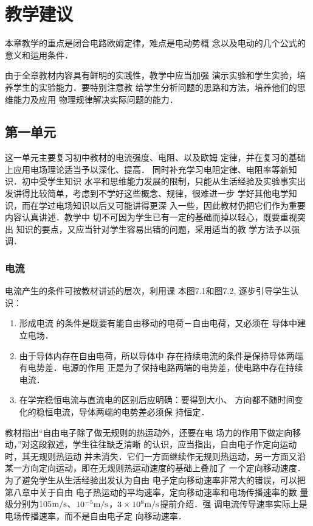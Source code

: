 \section{教学建议}
本章教学的重点是闭合电路欧姆定律，难点是电动势概
念以及电动的几个公式的意义和运用条件．

由于全章教材内容具有鲜明的实践性，教学中应当加强
演示实验和学生实验，培养学生的实验能力．要特别注意教
给学生分析问题的思路和方法，培养他们的思维能力及应用
物理规律解决实际问题的能力．


\subsection{第一单元}
这一单元主要复习初中教材的电流强度、电阻、以及欧姆
定律，并在复习的基础上应用电场理论适当予以深化、提高．
同时补充学习电阻定律、电阻率等新知识．初中受学生知识
水平和思维能力发展的限制，只能从生活经验及实验事实出
发讲得比较简单，考虑到不学好这些概念、规律，很难进一步
学好其他电学知识，而在学过电场知识以后又可能讲得更深
入一些，因此教材仍把它们作为重要内容认真讲述．教学中
切不可因为学生已有一定的基础而掉以轻心，既要重视突出
知识的要点，又应当针对学生容易出错的问题，采用适当的教
学方法予以强调．

\subsubsection{电流}

电流产生的条件可按教材讲述的层次，利用课
本图7.1和图7.2, 逐步引导学生认识：
\begin{enumerate}
\item 形成电流
的条件是既要有能自由移动的电荷－自由电荷，又必须在
导体中建立电场．    \item 由于导体内存在自由电荷，所以导体中
存在持续电流的条件是保持导体两端有电势差．电源的作用
正是为了保持电路两端的电势差，使电路中存在持续电流．
\item 在学完稳恒电流与直流电的区别后应明确：要得到大小、
方向都不随时间变化的稳恒电流，导体两端的电势差必须保
持恒定．
\end{enumerate}

教材指出“自由电子除了做无规则的热运动外，还要在电
场力的作用下做定向移动，”对这段叙述，学生往往缺乏清晰
的认识，应当指出，自由电子作定向运动时，其无规则热运动
并未消失．它们一方面继续作无规则热运动，另一方面又沿
某一方向定向运动，即在无规则热运动速度的基础上叠加了
一个定向移动速度．为了避免学生从生活经验出发认为自由
电子定向移动速率非常大的错误，可以把第八章中关于自由
电子热运动的平均速率，定向移动速率和电场传播速率的数
量级分别为105$\text{m}/\text{s}$、$10^{-5}\text{m}/\text{s}$，$3\times10^8\text{m}/\text{s}$提前介绍．强
调电流传导速率实际上是电场传播速率，而不是自由电子定
向移动速率．

